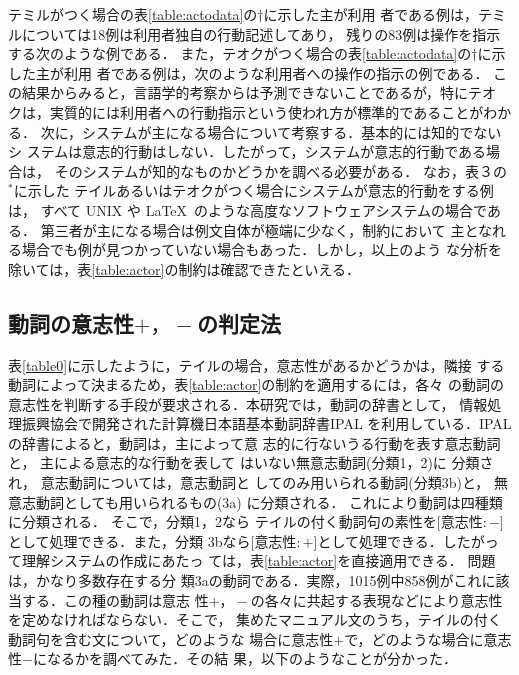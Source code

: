 {テミルがつく場合の表\ref{table:actodata}の$\dagger$に示した{\dg 主}が利用
者である例は，テミルについては18例は利用者独自の行動記述してあり，
残りの83例は操作を指示する次のような例である．
また，テオクがつく場合の表\ref{table:actodata}の$\dagger$に示した{\dg 主}が利用
者である例は，次のような利用者への操作の指示の例である．
この結果からみると，言語学的考察からは予測できないことであるが，特にテオ
クは，実質的には利用者への行動指示という使われ方が標準的であることがわか
る．
次に，システムが{\dg 主}になる場合について考察する．基本的には知的でないシ
ステムは意志的行動はしない．したがって，システムが意志的行動である場合は，
そのシステムが知的なものかどうかを調べる必要がある．
なお，表３の$^{\ast}$に示した
テイルあるいはテオクがつく場合にシステムが意志的行動をする例は，
すべて UNIX や \LaTeX\ のような高度なソフトウェアシステムの場合である．
第三者が{\dg 主}になる場合は例文自体が極端に少なく，制約において
{\dg 主}となれる場合でも例が見つかっていない場合もあった．しかし，以上のよう
な分析を除いては，表\ref{table:actor}の制約は確認できたといえる．

\subsection{動詞の意志性$+，-$の判定法}

表\ref{table0}に示したように，テイルの場合，意志性があるかどうかは，隣接
する動詞によって決まるため，表\ref{table:actor}の制約を適用するには，各々
の動詞の意志性を判断する手段が要求される．本研究では，動詞の辞書として，
情報処理振興協会で開発された計算機日本語基本動詞辞書IPAL
\cite{IPAL}を利用している．IPALの辞書によると，動詞は，{\dg 主}によって意
志的に行ないうる行動を表す意志動詞と， {\dg 主}による意志的な行動を表して
はいない無意志動詞(分類1，2)に 分類され， 意志動詞については，意志動詞と
してのみ用いられる動詞(分類3b)と， 無意志動詞としても用いられるもの(3a)
に分類される． これにより動詞は四種類に分類される． そこで，分類1，2なら 
テイルの付く動詞句の素性を$[$意志性$:-]$として処理できる．また，分類
3bなら$[$意志性$:+]$として処理できる．したがって理解システムの作成にあたっ
ては，表\ref{table:actor}を直接適用できる． 問題は，かなり多数存在する分
類3aの動詞である．実際，1015例中858例がこれに該当する．この種の動詞は意志
性$+，-$の各々に共起する表現などにより意志性を定めなければならない．そこで，
集めたマニュアル文のうち，テイルの付く動詞句を含む文について，どのような
場合に意志性$+$で，どのような場合に意志性$-$になるかを調べてみた．その結
果，以下のようなことが分かった．\\

}
